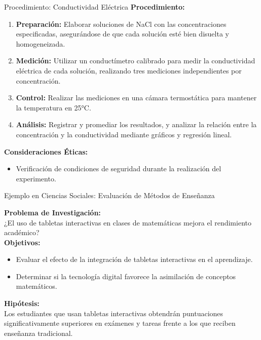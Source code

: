 ﻿\documentclass{beamer}
\begin{document}
\begin{frame}{Procedimiento: Conductividad Eléctrica}
  \textbf{Procedimiento:}
  \begin{enumerate}
      \item \textbf{Preparación:} Elaborar soluciones de NaCl con las concentraciones especificadas, asegurándose de que cada solución esté bien disuelta y homogeneizada.
      \item \textbf{Medición:} Utilizar un conductímetro calibrado para medir la conductividad eléctrica de cada solución, realizando tres mediciones independientes por concentración.
      \item \textbf{Control:} Realizar las mediciones en una cámara termostática para mantener la temperatura en 25°C.
      \item \textbf{Análisis:} Registrar y promediar los resultados, y analizar la relación entre la concentración y la conductividad mediante gráficos y regresión lineal.
  \end{enumerate}
  
  \vspace{2mm}
  \textbf{Consideraciones Éticas:}
  \begin{itemize}
      \item Verificación de condiciones de seguridad durante la realización del experimento.
  \end{itemize}
  
\end{frame}

\begin{frame}{Ejemplo en Ciencias Sociales: Evaluación de Métodos de Enseñanza}
  
  \textbf{Problema de Investigación:}\\
  ¿El uso de tabletas interactivas en clases de matemáticas mejora el rendimiento académico?\\[3mm]
  
  \textbf{Objetivos:}
  \begin{itemize}
      \item Evaluar el efecto de la integración de tabletas interactivas en el aprendizaje.
      \item Determinar si la tecnología digital favorece la asimilación de conceptos matemáticos.
  \end{itemize}
  
  \textbf{Hipótesis:}\\
  Los estudiantes que usan tabletas interactivas obtendrán puntuaciones significativamente superiores en exámenes y tareas frente a los que reciben enseñanza tradicional.
\end{frame}
\end{document}
